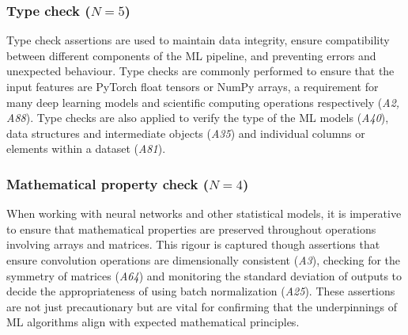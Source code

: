 
\subsubsection{Type check ($N = 5$)}

Type check assertions are used to maintain data integrity, ensure compatibility between different components of the ML pipeline, and preventing errors and unexpected behaviour. Type checks are commonly performed to ensure that the input features are PyTorch float tensors or NumPy arrays, a requirement for many deep learning models and scientific computing operations respectively (\emph{A2, A88}). Type checks are also applied to verify the type of the ML models (\emph{A40}), data structures and intermediate objects (\emph{A35}) and individual columns or elements within a dataset (\emph{A81}).


\subsubsection{Mathematical property check ($N = 4$)}

When working with neural networks and other statistical models, it is imperative to ensure that mathematical properties are preserved throughout operations involving arrays and matrices. This rigour is captured though assertions that ensure convolution operations are dimensionally consistent (\emph{A3}), checking for the symmetry of matrices (\emph{A64}) and monitoring the standard deviation of outputs to decide the appropriateness of using batch normalization (\emph{A25}). These assertions are not just precautionary but are vital for confirming that the underpinnings of ML algorithms align with expected mathematical principles.


